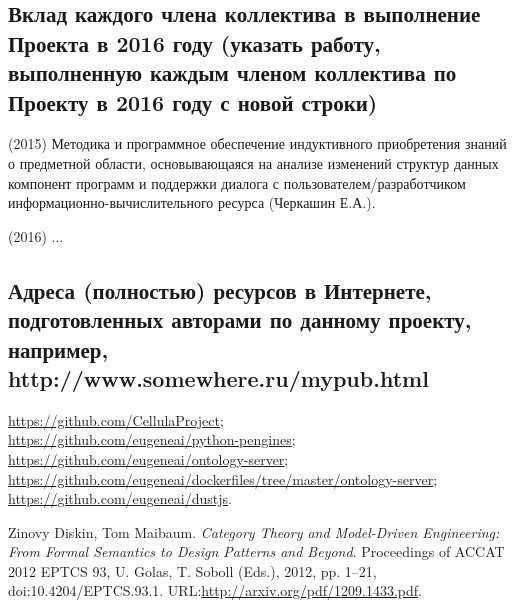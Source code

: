 \documentclass[12pt,a4paper]{ltxdoc}
\begin{document}
\subsection{Вклад каждого члена коллектива в выполнение Проекта в 2016 году
  (указать работу, выполненную каждым членом коллектива по Проекту в 2016 году с
  новой строки)}
(2015) Методика и программное обеспечение индуктивного приобретения знаний о предметной области, основывающаяся на анализе изменений структур данных компонент программ и поддержки диалога с пользователем/разработчиком информационно-вычислительного ресурса (Черкашин Е.А.).

(2016) ...


\subsection{Адреса (полностью) ресурсов в Интернете, подготовленных авторами по
  данному проекту, например, http://www.somewhere.ru/mypub.html}

\url{https://github.com/CellulaProject};\\
\url{https://github.com/eugeneai/python-pengines};\\
\url{https://github.com/eugeneai/ontology-server};\\
\url{https://github.com/eugeneai/dockerfiles/tree/master/ontology-server};\\
\url{https://github.com/eugeneai/dustjs}.

\begin{thebibliography}{9}
 Zinovy Diskin, Tom Maibaum. \emph{Category Theory and
    Model-Driven Engineering: From Formal Semantics to Design Patterns and Beyond}. Proceedings of ACCAT 2012
EPTCS 93, U. Golas, T. Soboll (Eds.), 2012, pp. 1–21, doi:10.4204/EPTCS.93.1. URL:\url{http://arxiv.org/pdf/1209.1433.pdf}.
\end{thebibliography}




\end{document}
